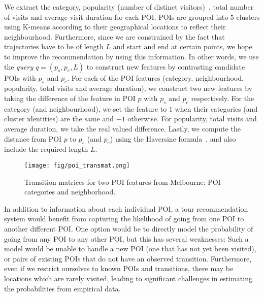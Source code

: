 We extract the category, popularity (number of distinct visitors)~\cite{ht10}, total number of visits and average visit duration for each POI.
POIs are grouped into $5$ clusters using K-means according to their geographical locations to reflect their neighbourhood.
Furthermore, since we are constrained by the fact that trajectories have to be of length $L$ and start and end at certain points, we hope to improve the recommendation by using this information.
In other words, we use the \textit{query} $q = (p_s, p_e, L)$ to construct new features by contrasting candidate POIs with $p_s$ and $p_e$.
%
For each of the POI features (category, neighbourhood, popularity, total visits and average duration),
we construct two new features by taking the difference of the feature in POI $p$ with $p_s$ and $p_e$ respectively.
For the category (and neighbourhood), we set the feature to $1$ when their categories (and cluster identities) are the same and $-1$ otherwise.
For popularity, total visits and average duration, we take the real valued difference.
Lastly, we compute the distance from POI $p$ to $p_s$ (and $p_e$) using the Haversine formula~\cite{haversine},
and also include the required length $L$.




\begin{figure}[t]
\texttt{[image: fig/poi\_transmat.png]}
\caption{Transition matrices for two POI features from Melbourne: POI categories and neighborhood.
}
\label{fig:transmat}\captionmoveup
\end{figure}


In addition to information about each individual POI, a tour recommendation system would benefit
from capturing the likelihood of going from one POI to another different POI. One option would be to
directly model the probability of going from any POI to any other POI, but this has several weaknesses:
Such a model would be unable to handle a new POI (one that has not yet been visited),
or pairs of existing POIs that do not have an observed transition.
Furthermore, even if we restrict ourselves to known POIs and transitions,
there may be locations which are rarely visited,
leading to significant challenges in estimating the probabilities from empirical data.

